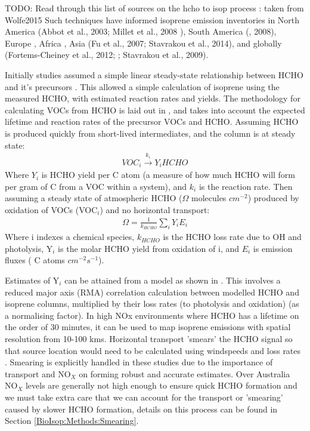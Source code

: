     TODO: Read through this list of sources on the hcho to isop process : taken from Wolfe2015
    Such techniques have informed isoprene emission inventories in North America (Abbot et al., 2003; Millet et al., 2008 \parencite{Palmer2003,Millet2006,Palmer2006}), South America (\parencite{Barkley2013}, 2008), Europe \parencite{Curci2010,Dufour2009}, Africa \parencite{Marais2012}, Asia (Fu et al., 2007; Stavrakou et al., 2014), and globally (Fortems-Cheiney et al., 2012; \parencite{Shim2005}; Stavrakou et al., 2009).
    
    Initially studies assumed a simple linear steady-state relationship between HCHO and it's precursors \parencite{Palmer2003, Palmer2006, Millet2006}.
    This allowed a simple calculation of isoprene using the measured HCHO, with estimated reaction rates and yields.
    The methodology for calculating VOCs from HCHO is laid out in \textcite{Palmer2003}, and takes into account the expected lifetime and reaction rates of the precursor VOCs and HCHO.
    Assuming HCHO is produced quickly from short-lived intermediates, and the column is at steady state:
    \begin{eqnarray*}
      VOC_i \overset{k_i}{\rightarrow} Y_i HCHO
    \end{eqnarray*}
    Where $Y_i$ is HCHO yield per C atom (a measure of how much HCHO will form per gram of C from a VOC within a system), and $k_i$ is the reaction rate.
    Then assuming a steady state of atmospheric HCHO ($\Omega$ molecules $cm^{-2}$) produced by oxidation of VOCs (VOC$_i$) and no horizontal transport:
    \begin{eqnarray*}
      \Omega = \frac{1}{k_{HCHO}} \sum_{i} Y_i E_i
    \end{eqnarray*}
    Where i indexes a chemical species, $k_{HCHO}$ is the HCHO loss rate due to OH and photolysis, Y$_i$ is the molar HCHO yield from oxidation of i, and $E_i$ is emission fluxes ( C atoms $cm^{-2}s^{-1}$).
    
    Estimates of Y$_i$ can be attained from a model as shown in \textcite{Millet2006}.
    This involves a reduced major axis (RMA) correlation calculation between modelled HCHO and isoprene columns, multiplied by their loss rates (to photolysis and oxidation) (as a normalising factor).  
    In high NOx environments where HCHO has a lifetime on the order of 30 minutes, it can be used to map isoprene emissions with spatial resolution from 10-100 kms.
    Horizontal transport 'smears' the HCHO signal so that source location would need to be calculated using windspeeds and loss rates \parencite{Palmer2001,Palmer2003}.
    Smearing is explicitly handled in these studies due to the importance of transport and NO$_X$ on forming robust and accurate estimates.
    Over Australia NO$_X$ levels are generally not high enough to ensure quick HCHO formation and we must take extra care that we can account for the transport or 'smearing' caused by slower HCHO formation, details on this process can be found in Section \ref{BioIsop:Methods:Smearing}.
    

